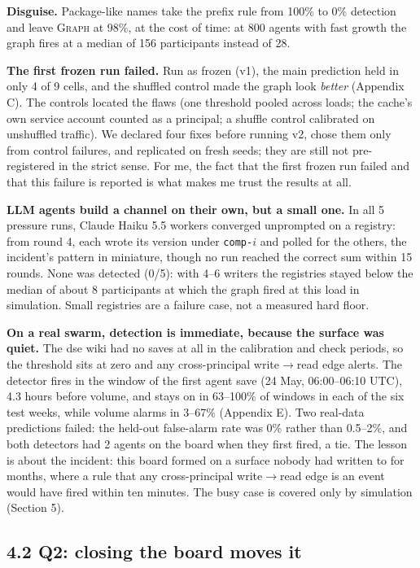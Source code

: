 \documentclass[10pt]{article}
\newcommand{\wrr}{write$\to$read}
\begin{document}
\textbf{Disguise.} Package-like names take the prefix rule from 100\% to 0\% detection and leave \textsc{Graph} at 98\%, at the cost of time: at 800 agents with fast growth the graph fires at a median of 156 participants instead of 28.

\textbf{The first frozen run failed.} Run as frozen (v1), the main prediction held in only 4 of 9 cells, and the shuffled control made the graph look \emph{better} (Appendix C). The controls located the flaws (one threshold pooled across loads; the cache's own service account counted as a principal; a shuffle control calibrated on unshuffled traffic). We declared four fixes before running v2, chose them only from control failures, and replicated on fresh seeds; they are still not pre-registered in the strict sense. For me, the fact that the first frozen run failed and that this failure is reported is what makes me trust the results at all.

\textbf{LLM agents build a channel on their own, but a small one.} In all 5 pressure runs, Claude Haiku 5.5 workers converged unprompted on a registry: from round 4, each wrote its version under \texttt{comp-}$i$ and polled for the others, the incident's pattern in miniature, though no run reached the correct sum within 15 rounds. None was detected (0/5): with 4--6 writers the registries stayed below the median of about 8 participants at which the graph fired at this load in simulation. Small registries are a failure case, not a measured hard floor.

\textbf{On a real swarm, detection is immediate, because the surface was quiet.} The dse wiki had no saves at all in the calibration and check periods, so the threshold sits at zero and any cross-principal \wrr{} edge alerts. The detector fires in the window of the first agent save (24 May, 06:00--06:10 UTC), 4.3 hours before volume, and stays on in 63--100\% of windows in each of the six test weeks, while volume alarms in 3--67\% (Appendix E). Two real-data predictions failed: the held-out false-alarm rate was 0\% rather than 0.5--2\%, and both detectors had 2 agents on the board when they first fired, a tie. The lesson is about the incident: this board formed on a surface nobody had written to for months, where a rule that any cross-principal \wrr{} edge is an event would have fired within ten minutes. The busy case is covered only by simulation (Section 5).

\subsection*{4.2 Q2: closing the board moves it}
\end{document}
